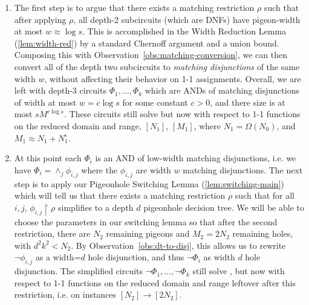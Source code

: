 \begin{enumerate}

 \item The first step is to argue that there exists a matching restriction $\rho$ such that after applying $\rho$, all depth-2 subcircuits (which are DNFs) have pigeon-width at most $w \approx \log s$. This is accomplished in the Width Reduction Lemma (\ref{lem:width-red}) by a standard Chernoff argument and a union bound. Composing this with Observation~\ref{obs:matching-conversion}, we can then convert all of the depth two subcircuits to \emph{matching disjunctions} of the same width $w$, without affecting their behavior on 1-1 assignments. Overall, we are left with depth-3 circuits $\Phi_1,\ldots,\Phi_k$ which are ANDs of matching disjunctions of width at most $w = c \log s$ for some constant $c>0$, and there size is at most $s M^{c \log s}$.
 These circuits still solve \avoid but now with respect to 1-1 functions on the reduced domain and range, $[N_1]$, $[M_1]$,  where $N_1 =\Omega(N_0)$, and $M_1 \approx N_1 + N_1^{\epsilon}$.
 \item At this point each $\Phi_i$ is an AND of low-width matching disjunctions, i.e. we have $\Phi_i = \land_j \phi_{i,j}$ where the $\phi_{i,j}$ are width $w$ matching disjunctions. The next step is to apply our Pigeonhole Switching Lemma (\ref{lem:switching-main}) which will tell us that there exists a matching restriction $\rho$ such that for all $i,j$,  $\phi_{i,j}\upharpoonright\rho$ simplifies to a depth $d$ pigeonhole decision tree. We will be able to choose the parameters in our switching lemma so that after the second restriction, there are $N_2$ remaining pigeons and $M_2= 2N_2$ remaining holes, with $d^2k^2 < N_2$. By Observation~\ref{obs:dt-to-disj}, this allows us to rewrite $\lnot \phi_{i,j}$ as a width=$d$ hole disjunction, and thus $\lnot \Phi_i$ as width $d$ hole disjunction. The simplified circuits $\lnot \Phi_1,\ldots, \lnot \Phi_k$ still solve \avoid, but now with respect to 1-1 functions on the reduced domain and range leftover after this restriction, i.e. on instances $[N_2] \to [2N_2]$.
 

\end{enumerate}
